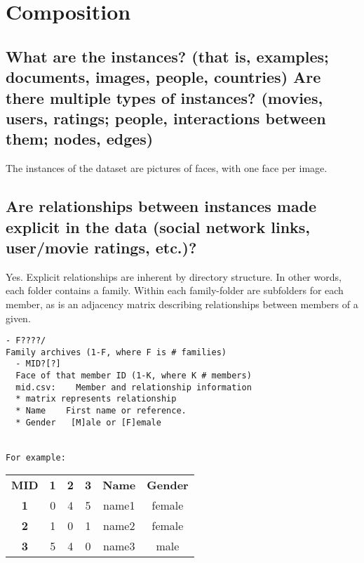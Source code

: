 \section*{Composition}
\subsection*{What are the instances? (that is, examples; \eg documents, images, people, countries) Are there multiple types of instances? (\eg movies, users, ratings; people, interactions between them; nodes, edges)}
\noindent
{\color{red} The instances of the dataset are pictures of faces, with one face per image.} 

\subsection*{Are relationships between instances made explicit in the data (\eg social network links, user/movie ratings, etc.)?}
\noindent
Yes. Explicit relationships are inherent by directory structure. In other words, each folder contains a family. Within each family-folder are subfolders for each member, as is an adjacency matrix describing relationships between members of a given.

\begin{lstlisting}
- F????/    
Family archives (1-F, where F is # families)
  - MID?[?]
  Face of that member ID (1-K, where K # members)
  mid.csv:    Member and relationship information
  * matrix represents relationship
  * Name    First name or reference.
  * Gender   [M]ale or [F]emale
  
      
For example:
\end{lstlisting}
\begin{center}
    

\begin{tabular}{cccccc}
\textbf{MID} &     \textbf{1}   &    \textbf{2} &      \textbf{3} &  \textbf{Name}  &   \textbf{Gender}\\
\textbf{1} &      0  &     4  &     5&   name1   &  female\\
\textbf{2}  &     1   &    0  &     1&   name2&     female\\
\textbf{3} &     5  &     4  &     0&   name3 &  male\\
\end{tabular}
\end{center}

